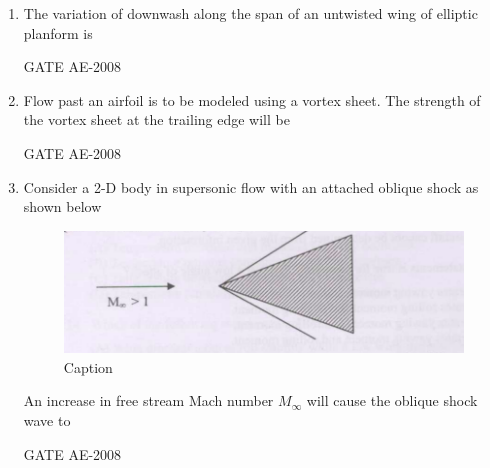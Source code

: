 \documentclass[journal,12pt,onecolumn]{IEEEtran}
\theoremstyle{remark}
\begin{document}
\begin{enumerate}
    \quad

\item The variation of downwash along the span of an untwisted wing of elliptic planform is  \\
\begin{enumerate}
\end{enumerate}
 \hfill{GATE AE-2008}

    \quad

\item Flow past an airfoil is to be modeled using a vortex sheet. The strength of the vortex sheet at the trailing edge will be  \\
\begin{enumerate}
\end{enumerate}
 \hfill{GATE AE-2008}

    \quad

\item Consider a 2-D body in supersonic flow with an attached oblique shock as shown below  
\begin{figure}[H]
    \centering
    \includegraphics[width=0.5\linewidth]{figs/Screenshot from 2025-08-08 11-48-03.png}
    \caption{Caption}
    \label{fig:placeholder}
\end{figure}
An increase in free stream Mach number $M_\infty$ will cause the oblique shock wave to \\
\begin{enumerate}
\end{enumerate}
 \hfill{GATE AE-2008}


\end{enumerate}
\end{document}
